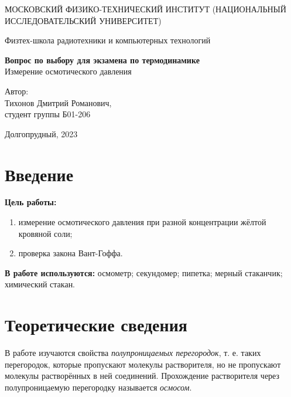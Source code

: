 \documentclass[a4paper, 12pt]{article}
\begin{document}
    \begin{titlepage}
	\begin{center}
            {\large МОСКОВСКИЙ ФИЗИКО-ТЕХНИЧЕСКИЙ ИНСТИТУТ (НАЦИОНАЛЬНЫЙ       ИССЛЕДОВАТЕЛЬСКИЙ УНИВЕРСИТЕТ)}
	\end{center}
 
	\begin{center}
		{\large Физтех-школа радиотехники и компьютерных технологий}
	\end{center}
	
	\vspace{8cm}
	{\LARGE
		\begin{center}
                {\bf Вопрос по выбору для экзамена по термодинамике}\\
                Измерение осмотического давления
		\end{center}
	}
	\vspace{5cm}
	\begin{flushright}
		{\Large Автор:\\ Тихонов Дмитрий Романович, \\
			\vspace{0.2cm}
			студент группы Б01-206}
	\end{flushright}
	\vspace{5cm}
	\begin{center}
		\Large Долгопрудный, 2023
	\end{center}
    \end{titlepage}

    \section{Введение}

    \noindent \textbf{Цель работы:}  
    \begin{enumerate}
        \item измерение осмотического давления при разной концентрации жёлтой кровяной соли;
        \item проверка закона Вант-Гоффа.
    \end{enumerate}

    \noindent \textbf{В работе используются:} осмометр; секундомер; пипетка; мерный стаканчик; химический стакан.
    
    \section{Теоретические сведения}

    \noindent В работе изучаются свойства \textit{полупроницаемых перегородок}, т. е. таких перегородок, которые пропускают молекулы растворителя, но не пропускают молекулы растворённых в ней соединений. Прохождение растворителя через полупроницаемую перегородку называется \textit{осмосом}. \\
    
\end{document}
